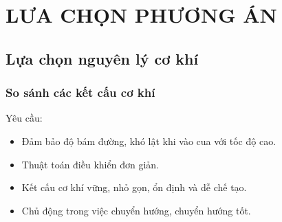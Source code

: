 \chapter{LƯA CHỌN PHƯƠNG ÁN}
    \section{Lựa chọn nguyên lý cơ khí}
        \subsection{So sánh các kết cấu cơ khí}
            \hspace*{0.6cm}Yêu cầu:
            \begin{itemize}
                \item Đảm bảo độ bám đường, khó lật khi vào cua với tốc độ cao.
                \item Thuật toán điều khiển đơn giản.
                \item Kết cấu cơ khí vững, nhỏ gọn, ổn định và dễ chế tạo.
                \item Chủ động trong việc chuyển hướng, chuyển hướng tốt. 
            \end{itemize}
